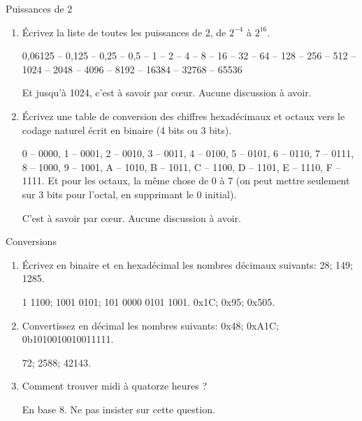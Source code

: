 \begin{exercice}
  \begin{exercicelet}{Puissances de 2}
    \begin{enumerate}
    \item Écrivez la liste de toutes les puissances de 2, de $2^{-4}$ à
      $2^{16}$.
      \begin{xcorrection} 0,06125 -- 0,125 -- 0,25 -- 0,5 -- 1 -- 2 -- 4 -- 8
        -- 16 -- 32 -- 64 -- 128 -- 256 -- 512 -- 1024 -- 2048 -- 4096 -- 8192
        -- 16384 -- 32768 -- 65536

        Et jusqu'à 1024, c'est à savoir par c\oe ur. Aucune discussion à
        avoir.
      \end{xcorrection}
    \item Écrivez une table de conversion des chiffres hexadécimaux et
      octaux vers le codage naturel écrit en binaire (4 bits ou 3 bits).
      \begin{xcorrection} 0 -- 0000, 1 -- 0001, 2 -- 0010, 3 -- 0011, 4 --
        0100, 5 -- 0101, 6 -- 0110, 7 -- 0111, 8 -- 1000, 9 -- 1001, A -- 1010,
        B -- 1011, C -- 1100, D -- 1101, E -- 1110, F -- 1111. Et pour les
        octaux, la même chose de 0 à 7 (on peut mettre seulement sur 3 bits pour
        l'octal, en supprimant le 0 initial).

        C'est à savoir par c\oe ur. Aucune discussion à avoir.
      \end{xcorrection}
    \end{enumerate}
  \end{exercicelet}
  \begin{exercicelet}{Conversions}
    \begin{enumerate}
    \item Écrivez en binaire et en hexadécimal les nombres décimaux
      suivants: 28; 149; 1285.
      \begin{xcorrection}
        1 1100; 1001 0101; 101 0000 0101 1001.
        0x1C; 0x95; 0x505.
      \end{xcorrection}
    \item Convertissez en décimal les nombres suivants: 0x48; 0xA1C; 0b1010010010011111.
      \begin{xcorrection}
        72; 2588; 42143.
      \end{xcorrection}
    \item Comment trouver midi à quatorze heures ?
      \begin{xcorrection}En base 8. Ne pas insister sur cette
        question.\end{xcorrection}
    \end{enumerate}
  \end{exercicelet}
\end{exercice}

